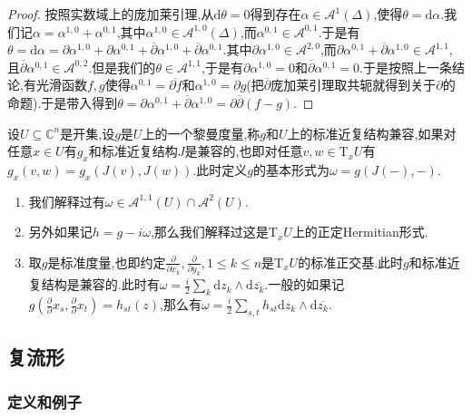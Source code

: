 \begin{enumerate}
\begin{proof}
		按照实数域上的庞加莱引理,从$\mathrm{d}\theta=0$得到存在$\alpha\in\mathscr{A}^1(\Delta)$,使得$\theta=\mathrm{d}\alpha$.我们记$\alpha=\alpha^{1,0}+\alpha^{0,1}$,其中$\alpha^{1,0}\in\mathscr{A}^{1,0}(\Delta)$,而$\alpha^{0,1}\in\mathscr{A}^{0,1}$.于是有$\theta=\mathrm{d}\alpha=\partial\alpha^{1,0}+\partial\alpha^{0,1}+\overline{\partial}\alpha^{1,0}+\overline{\partial}\alpha^{0,1}$.其中$\partial\alpha^{1,0}\in\mathscr{A}^{2,0}$,而$\partial\alpha^{0,1}+\overline{\partial}\alpha^{1,0}\in\mathscr{A}^{1,1}$,且$\overline{\partial}\alpha^{0,1}\in\mathscr{A}^{0,2}$.但是我们的$\theta\in\mathscr{A}^{1,1}$,于是有$\partial\alpha^{1,0}=0$和$\overline{\partial}\alpha^{0,1}=0$.于是按照上一条结论,有光滑函数$f,g$使得$\alpha^{0,1}=\overline{\partial f}$和$\alpha^{1,0}=\partial g$(把$\overline{\partial}$庞加莱引理取共轭就得到关于$\partial$的命题).于是带入得到$\theta=\partial\alpha^{0,1}+\overline{\partial}\alpha^{1,0}=\partial\overline{\partial}(f-g)$.
	\end{proof}
\end{enumerate}

设$U\subseteq\mathbb{C}^n$是开集,设$g$是$U$上的一个黎曼度量,称$g$和$U$上的标准近复结构兼容,如果对任意$x\in U$有$g_x$和标准近复结构$J$是兼容的,也即对任意$v,w\in\mathrm{T}_xU$有$g_x(v,w)=g_x(J(v),J(w))$.此时定义$g$的基本形式为$\omega=g(J(-),-)$.
\begin{enumerate}
	\item 我们解释过有$\omega\in\mathscr{A}^{1,1}(U)\cap\mathscr{A}^2(U)$.
	\item 另外如果记$h=g-i\omega$,那么我们解释过这是$\mathrm{T}_xU$上的正定Hermitian形式.
	\item 取$g$是标准度量,也即约定$\frac{\partial}{\partial x_k},\frac{\partial}{\partial y_k},1\le k\le n$是$\mathrm{T}_xU$的标准正交基.此时$g$和标准近复结构是兼容的.此时有$\omega=\frac{i}{2}\sum_k\mathrm{d}z_k\wedge\mathrm{d}\overline{z_k}$.一般的如果记$g(\frac{\partial}{\partial} x_s,\frac{\partial}{\partial} x_t)=h_{st}(z)$,那么有$\omega=\frac{i}{2}\sum_{s,t}h_{st}\mathrm{d}z_k\wedge\mathrm{d}\overline{z_k}$.
\end{enumerate}
\newpage
\subsection{复流形}
\subsubsection{定义和例子}

